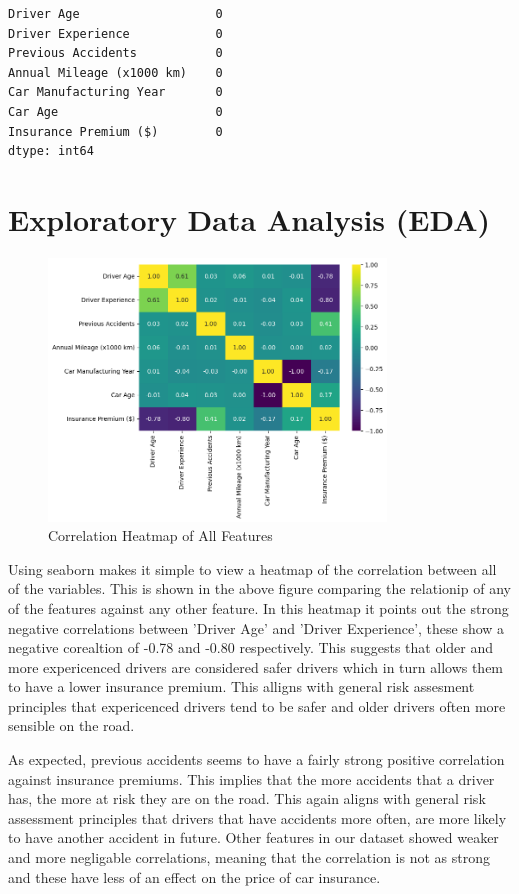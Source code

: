 \documentclass{article}
\begin{document}
\begin{verbatim}
Driver Age                   0
Driver Experience            0
Previous Accidents           0
Annual Mileage (x1000 km)    0
Car Manufacturing Year       0
Car Age                      0
Insurance Premium ($)        0
dtype: int64
\end{verbatim}





\newpage
\section{Exploratory Data Analysis (EDA)}

\begin{figure}[h]
\centering
\includegraphics[width=0.8\textwidth]{heatmap.png}
\caption{Correlation Heatmap of All Features}\label{fig:heatmap}
\end{figure}

Using seaborn makes it simple to view a heatmap of the correlation between all of the variables. This is shown in the above figure comparing the relationip of any of the features against any other feature. In this heatmap it points out the strong negative correlations between 'Driver Age' and 'Driver Experience', these show a negative corealtion of -0.78 and -0.80 respectively. This suggests that older and more expericenced drivers are considered safer drivers which in turn allows them to have a lower insurance premium. This alligns with general risk assesment principles that expericenced drivers tend to be safer and older drivers often more sensible on the road. 

As expected, previous accidents seems to have a fairly strong positive correlation against insurance premiums. This implies that the more accidents that a driver has, the more at risk they are on the road. This again aligns with general risk assessment principles that drivers that have accidents more often, are more likely to have another accident in future. Other features in our dataset showed weaker and more negligable correlations, meaning that the correlation is not as strong and these have less of an effect on the price of car insurance.
\end{document}
